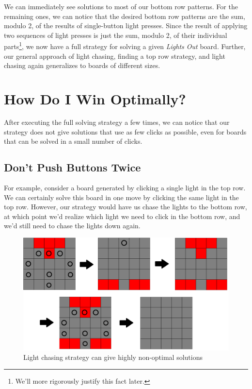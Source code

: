 \documentclass[a4paper]{article}
\begin{document}
	We can immediately see solutions to most of our bottom row patterns.
	For the remaining ones, we can notice that the desired bottom row patterns are the sum, modulo 2, of the results of single-button light presses.
	Since the result of applying two sequences of light presses is just the sum, modulo 2, of their individual parts\footnote{We'll more rigorously justify this fact later.}, we now have a full strategy for solving a given \textit{Lights Out} board.
	Further, our general approach of light chasing, finding a top row strategy, and light chasing again generalizes to boards of different sizes.
	
	\section{How Do I Win Optimally?}
	After executing the full solving strategy a few times, we can notice that our strategy does not give solutions that use as few clicks as possible, even for boards that can be solved in a small number of clicks.
	
	\subsection{Don't Push Buttons Twice}
	For example, consider a board generated by clicking a single light in the top row.
	We can certainly solve this board in one move by clicking the same light in the top row.
	However, our strategy would have us chase the lights to the bottom row, at which point we'd realize which light we need to click in the bottom row, and we'd still need to chase the lights down again.
	
	\begin{figure}[H]
		\centering
		\includegraphics[width=\textwidth]{board5.png}
		\caption{Light chasing strategy can give highly non-optimal solutions}
	\end{figure}
\end{document}
